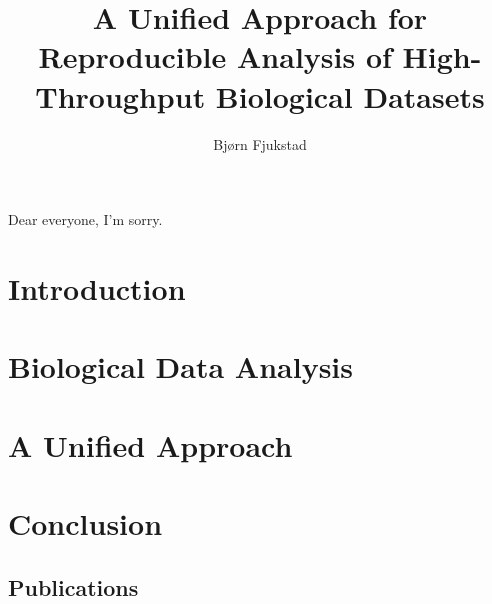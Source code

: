 \documentclass[USenglish,phd]{uit-thesis}
\begin{document}
 

\title{A Unified Approach for Reproducible Analysis of High-Throughput
Biological Datasets}
\author{Bjørn Fjukstad}
\maketitle

\begin{dedication}
    Dear everyone, I'm sorry.
\end{dedication}

\frontmatter
 
 

\tableofcontents
\mainmatter

\chapter{Introduction}
 

\chapter{Biological Data Analysis}


\chapter{A Unified Approach}  


\chapter{Conclusion}
 

\appendix
\begin{appendix}
    \chapter{Publications}
\end{appendix}

\backmatter



\end{document}

